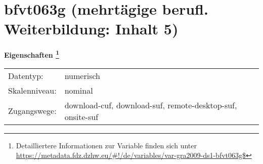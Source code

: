 
    \setcounter{footnote}{0}

    \vspace*{-1.8cm}
	\section{bfvt063g (mehrtägige berufl. Weiterbildung: Inhalt 5)}
	\label{section:bfvt063g}



    \vspace*{0.5cm}
    \noindent\textbf{Eigenschaften
	\footnote{Detailliertere Informationen zur Variable finden sich unter
		\url{https://metadata.fdz.dzhw.eu/\#!/de/variables/var-gra2009-ds1-bfvt063g$}}}\\
	\begin{tabularx}{\hsize}{@{}lX}
	Datentyp: & numerisch \\
	Skalenniveau: & nominal \\
	Zugangswege: &
	  download-cuf, 
	  download-suf, 
	  remote-desktop-suf, 
	  onsite-suf
 \\
    \end{tabularx}



